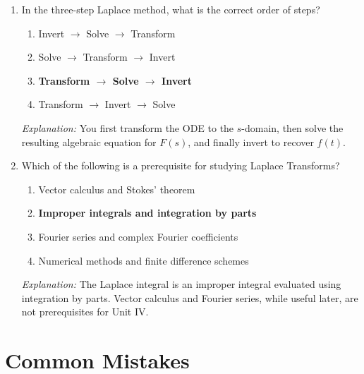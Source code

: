 \documentclass[12pt,a4paper]{article}
\begin{document}
\begin{enumerate}[label=\textbf{MCQ \arabic*.}, leftmargin=*, itemsep=10pt]
  \item In the three-step Laplace method, what is the correct order of steps?
        \begin{enumerate}[label=(\alph*)]
          \item Invert $\to$ Solve $\to$ Transform
          \item Solve $\to$ Transform $\to$ Invert
          \item \textbf{Transform $\to$ Solve $\to$ Invert}
          \item Transform $\to$ Invert $\to$ Solve
        \end{enumerate}
        \textit{Explanation:} You first transform the ODE to the $s$-domain,
        then solve the resulting algebraic equation for $F(s)$, and finally
        invert to recover $f(t)$.

  \item Which of the following is a prerequisite for studying Laplace
        Transforms?
        \begin{enumerate}[label=(\alph*)]
          \item Vector calculus and Stokes' theorem
          \item \textbf{Improper integrals and integration by parts}
          \item Fourier series and complex Fourier coefficients
          \item Numerical methods and finite difference schemes
        \end{enumerate}
        \textit{Explanation:} The Laplace integral is an improper integral
        evaluated using integration by parts.  Vector calculus and Fourier
        series, while useful later, are not prerequisites for Unit IV.

\end{enumerate}

\section{Common Mistakes}
\end{document}
